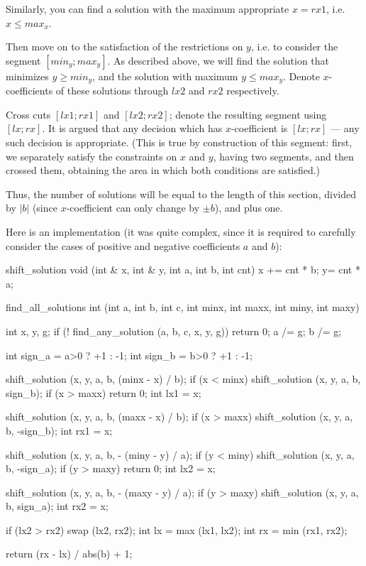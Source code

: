 Similarly, you can find a solution with the maximum appropriate $x=rx1$, i.e. $x \le max_x$.

Then move on to the satisfaction of the restrictions on $y$, i.e. to consider the segment $[min_y;max_y]$. As described above, we will find the solution that minimizes $y \ge min_y$, and the solution with maximum $y \le max_y$. Denote $x$-coefficients of these solutions through $lx2$ and $rx2$ respectively.

Cross cuts $[lx1;rx1]$ and $[lx2;rx2]$; denote the resulting segment using $[lx;rx]$. It is argued that any decision which has $x$-coefficient is $[lx;rx]$ --- any such decision is appropriate. (This is true by construction of this segment: first, we separately satisfy the constraints on $x$ and $y$, having two segments, and then crossed them, obtaining the area in which both conditions are satisfied.)

Thus, the number of solutions will be equal to the length of this section, divided by $|b|$ (since $x$-coefficient can only change by $\pm b$), and plus one.

Here is an implementation (it was quite complex, since it is required to carefully consider the cases of positive and negative coefficients $a$ and $b$):

\code
shift_solution void (int & x, int & y, int a, int b, int cnt) {
x += cnt * b;
 y= cnt * a;
}

find_all_solutions int (int a, int b, int c, int minx, int maxx, int miny, int maxy) {
int x, y, g;
if (! find_any_solution (a, b, c, x, y, g))
return 0;
a /= g; b /= g;

int sign_a = a>0 ? +1 : -1;
int sign_b = b>0 ? +1 : -1;

shift_solution (x, y, a, b, (minx - x) / b);
if (x < minx)
shift_solution (x, y, a, b, sign_b);
if (x > maxx)
return 0;
int lx1 = x;

shift_solution (x, y, a, b, (maxx - x) / b);
if (x > maxx)
shift_solution (x, y, a, b, -sign_b);
int rx1 = x;

shift_solution (x, y, a, b, - (miny - y) / a);
if (y < miny)
shift_solution (x, y, a, b, -sign_a);
if (y > maxy)
return 0;
int lx2 = x;

shift_solution (x, y, a, b, - (maxy - y) / a);
if (y > maxy)
shift_solution (x, y, a, b, sign_a);
int rx2 = x;

if (lx2 > rx2)
swap (lx2, rx2);
int lx = max (lx1, lx2);
int rx = min (rx1, rx2);

return (rx - lx) / abs(b) + 1;
}
\endcode

